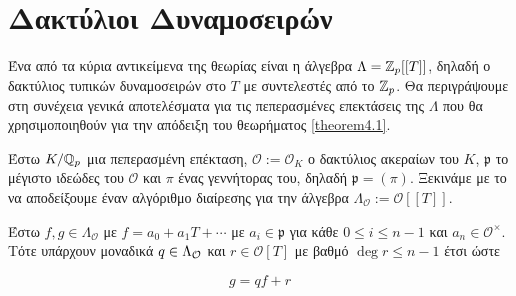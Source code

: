 \section{Δακτύλιοι Δυναμοσειρών}

Ένα από τα κύρια αντικείμενα της θεωρίας  είναι η  άλγεβρα $\Lambda = \mathbb{Z}_p[[T]]$, δηλαδή ο δακτύλιος τυπικών δυναμοσειρών στο $T$ 
με συντελεστές από το $\mathbb{Z}_p$. Θα περιγράψουμε στη συνέχεια γενικά αποτελέσματα για τις πεπερασμένες επεκτάσεις της $\Lambda$ που θα χρησιμοποιηθούν για την απόδειξη του θεωρήματος \ref{theorem4.1}.


Έστω $K/\mathbb{Q}_p$ μια πεπερασμένη επέκταση, $\mathcal{O}:= \mathcal{O}_K$ ο δακτύλιος ακεραίων του $K$, $\mathfrak{p}$ το μέγιστο ιδεώδες του $\mathcal{O}$ και $\pi$ ένας γεννήτορας του, δηλαδή $\mathfrak{p} = (\pi)$. Ξεκινάμε με το να αποδείξουμε έναν αλγόριθμο διαίρεσης για την άλγεβρα $\Lambda_{\mathcal{O}} := \mathcal{O}[[T]]$.

\begin{prop}
	Έστω $f,g \in \Lambda_{\mathcal{O}}$ με $f = a_0 + a_1 T + \cdots$ με $a_i \in \mathfrak{p}$ για κάθε $0\leq i \leq n-1$ και $a_n \in \mathcal{O}^\times$. Τότε υπάρχουν μοναδικά $q \in \Lambda_\mathcal{O}$ και $r \in \mathcal{O} [T]$ με βαθμό $\deg r\leq n-1$ έτσι ώστε

	$$g = qf + r$$
\end{prop}

